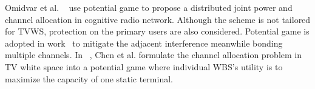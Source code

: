 \documentclass[times]{ettauth}
\newcommand{\ie}{i.e., }
\theoremstyle{mytheoremstyle}
\theoremstyle{mytheoremstyle}
\theoremstyle{mytheoremstyle}
\begin{document}
Omidvar et al. ~\cite{pimrc_2012} use potential game to propose a distributed joint power and channel allocation in cognitive radio network.
Although the scheme is not tailored for TVWS, protection on the primary users are also considered.
Potential game is adopted in work~\cite{Elias17} to mitigate the adjacent interference meanwhile bonding multiple channels.
In ~\cite{spectrum_sharing_tvspace_2012}, Chen et al. formulate the channel allocation problem in TV white space into a potential game where individual WBS's utility is to maximize the capacity of one static terminal.
\end{document}
